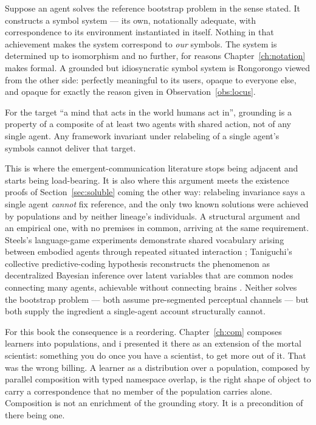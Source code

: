 Suppose an agent solves the reference bootstrap problem in the
sense stated.
It constructs a symbol system --- its own, notationally adequate,
with correspondence to its environment instantiated in itself.
Nothing in that achievement makes the system correspond to
\emph{our} symbols.
The system is determined up to isomorphism and no further, for
reasons Chapter~\ref{ch:notation} makes formal.
A grounded but idiosyncratic symbol system is Rongorongo viewed
from the other side: perfectly meaningful to its users, opaque to
everyone else, and opaque for exactly the reason given in
Observation~\ref{obs:locus}.

\begin{observation}
\label{obs:social}
For the target ``a mind that acts in the world humans act in'',
grounding is a property of a composite of at least two agents with
shared action, not of any single agent.
Any framework invariant under relabeling of a single agent's
symbols cannot deliver that target.
\end{observation}

\noindent
This is where the emergent-communication literature stops being
adjacent and starts being load-bearing.
It is also where this argument meets the existence proofs of
Section~\ref{sec:soluble} coming the other way: relabeling
invariance says a single agent \emph{cannot} fix reference, and the
only two known solutions were achieved by populations and by
neither lineage's individuals.
A structural argument and an empirical one, with no premises in
common, arriving at the same requirement.
Steels's language-game experiments demonstrate shared vocabulary
arising between embodied agents through repeated situated
interaction \cite{steels2015}; Taniguchi's collective
predictive-coding hypothesis reconstructs the phenomenon as
decentralized Bayesian inference over latent variables that are
common nodes connecting many agents, achievable without connecting
brains \cite{taniguchi2024}.
Neither solves the bootstrap problem --- both assume pre-segmented
perceptual channels --- but both supply the ingredient a
single-agent account structurally cannot.

For this book the consequence is a reordering.
Chapter~\ref{ch:com} composes learners into populations, and i
presented it there as an extension of the mortal scientist:
something you do once you have a scientist, to get more out of it.
That was the wrong billing.
A learner as a distribution over a population, composed by parallel
composition with typed namespace overlap, is the right shape of
object to carry a correspondence that no member of the population
carries alone.
Composition is not an enrichment of the grounding story.
It is a precondition of there being one.

